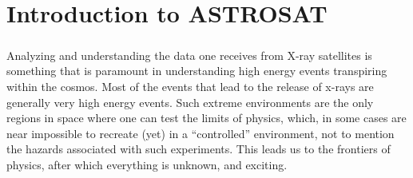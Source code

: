 \documentclass[a4paper,twoside]{report}
\numberwithin{equation}{section}
\begin{document}
\chapter{Introduction to ASTROSAT}
\paragraph{}
Analyzing and understanding the data one receives from X-ray satellites is something that is paramount in understanding high energy events transpiring within the cosmos. Most of the events that lead to the release of x-rays are generally very high energy events. Such extreme environments are the only regions in space where one can test the limits of physics, which, in some cases are near impossible to recreate (yet) in a “controlled” environment, not to mention the hazards associated with such experiments. This leads us to the frontiers of physics, after which everything is unknown, and exciting.
\end{document}
